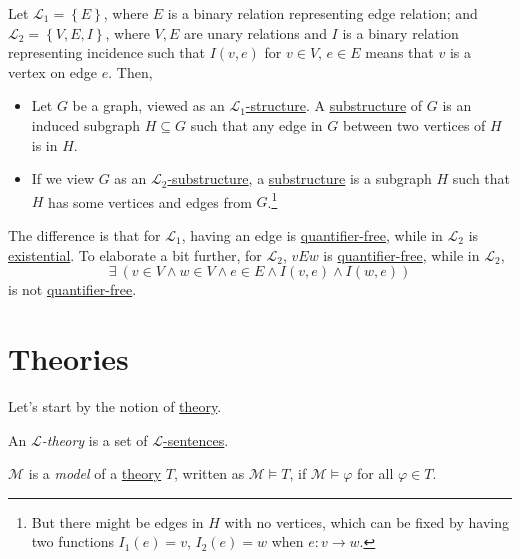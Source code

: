 \begin{eg}
	Let \(\mathcal{L} _1 = \left\{ E \right\} \), where \(E\) is a binary relation representing edge relation; and \(\mathcal{L} _2 = \left\{ V, E, I \right\} \), where \(V, E\) are unary relations and \(I\) is a binary relation representing incidence such that \(I(v, e)\) for \(v\in V\), \(e\in E\) means that \(v\) is a vertex on edge \(e\). Then,
	\begin{itemize}
		\item Let \(G\) be a graph, viewed as an \hyperref[def:structure]{\(\mathcal{L} _1\)-structure}. A \hyperref[def:substructure]{substructure} of \(G\) is an induced subgraph \(H \subseteq G\) such that any edge in \(G\) between two vertices of \(H\) is in \(H\).
		\item If we view \(G\) as an \hyperref[def:substructure]{\(\mathcal{L} _2\)-substructure}, a \hyperref[def:substructure]{substructure} is a subgraph \(H\) such that \(H\) has some vertices and edges from \(G\).\footnote{But there might be edges in \(H\) with no vertices, which can be fixed by having two functions \(I_1(e)=v\), \(I_2(e)=w\) when \(e\colon v \to w\).}
	\end{itemize}
\end{eg}

The difference is that for \(\mathcal{L} _1\), having an edge is \hyperref[not:quantifier-free]{quantifier-free}, while in \(\mathcal{L} _2\) is \hyperref[not:existential]{existential}. To elaborate a bit further, for \(\mathcal{L} _2\), \(vEw\) is \hyperref[not:quantifier-free]{quantifier-free}, while in \(\mathcal{L} _2\),
\[
	\exists \ (v\in V \land w\in V \land e\in E \land I(v, e) \land I(w, e))
\]
is not \hyperref[not:quantifier-free]{quantifier-free}.

\section{Theories}
Let's start by the notion of \hyperref[def:theory]{theory}.

\begin{definition}[Theory]\label{def:theory}
	An \emph{\(\mathcal{L}\)-theory} is a set of \hyperref[def:sentence]{\(\mathcal{L} \)-sentences}.
\end{definition}

\begin{definition}[Model]\label{def:model}
	\(\mathcal{M} \) is a \emph{model} of a \hyperref[def:theory]{theory} \(T\), written as \(\mathcal{M} \models T\), if \(\mathcal{M} \models \varphi \) for all \(\varphi \in T\).
\end{definition}

